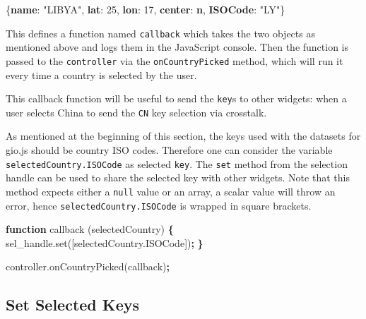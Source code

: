 \documentclass[
  10pt,
]{krantz}
\makeatletter
\newenvironment{Shaded}{\begin{snugshade}}{\end{snugshade}}
\newcommand{\AttributeTok}[1]{\textcolor[rgb]{0.61,0.61,0.61}{#1}}
\newcommand{\DecValTok}[1]{\textcolor[rgb]{0.06,0.06,0.06}{#1}}
\newcommand{\ErrorTok}[1]{\textcolor[rgb]{0.14,0.14,0.14}{\textbf{#1}}}
\newcommand{\FunctionTok}[1]{\textcolor[rgb]{0,0,0}{#1}}
\newcommand{\KeywordTok}[1]{\textcolor[rgb]{0.27,0.27,0.27}{\textbf{#1}}}
\newcommand{\NormalTok}[1]{#1}
\newcommand{\OperatorTok}[1]{\textcolor[rgb]{0.43,0.43,0.43}{\textbf{#1}}}
\newcommand{\StringTok}[1]{\textcolor[rgb]{0.5,0.5,0.5}{#1}}
\newcommand{\VariableTok}[1]{\textcolor[rgb]{0,0,0}{#1}}
\newenvironment{kframe}{%
\medskip{}
\setlength{\fboxsep}{.8em}
 \def\at@end@of@kframe{}%
 \ifinner\ifhmode%
  \def\at@end@of@kframe{\end{minipage}}%
  \begin{minipage}{\columnwidth}%
 \fi\fi%
 \def\FrameCommand##1{\hskip\@totalleftmargin \hskip-\fboxsep
 \colorbox{shadecolor}{##1}\hskip-\fboxsep
     \hskip-\linewidth \hskip-\@totalleftmargin \hskip\columnwidth}%
 \MakeFramed {\advance\hsize-\width
   \@totalleftmargin\z@ \linewidth\hsize
   \@setminipage}}%
 {\par\unskip\endMakeFramed%
 \at@end@of@kframe}
\renewenvironment{Shaded}{\begin{kframe}}{\end{kframe}}
\makeatother
\begin{document}
\begin{Shaded}
\begin{Highlighting}[]
\FunctionTok{\{}\ErrorTok{name}\FunctionTok{:} \StringTok{"LIBYA"}\FunctionTok{,} \ErrorTok{lat}\FunctionTok{:} \DecValTok{25}\FunctionTok{,} \ErrorTok{lon}\FunctionTok{:} \DecValTok{17}\FunctionTok{,} \ErrorTok{center}\FunctionTok{:} \ErrorTok{n}\FunctionTok{,} \ErrorTok{ISOCode}\FunctionTok{:} \StringTok{"LY"}\FunctionTok{\}}
\end{Highlighting}
\end{Shaded}

This defines a function named \texttt{callback} which takes the two objects as mentioned above and logs them in the JavaScript console. Then the function is passed to the \texttt{controller} via the \texttt{onCountryPicked} method, which will run it every time a country is selected by the user.

This callback function will be useful to send the \texttt{key}s to other widgets: when a user selects China to send the \texttt{CN} key selection via crosstalk.

As mentioned at the beginning of this section, the keys used with the datasets for gio.js should be country ISO codes. Therefore one can consider the variable \texttt{selectedCountry.ISOCode} as selected \texttt{key}. The \texttt{set} method from the selection handle can be used to share the selected key with other widgets. Note that this method expects either a \texttt{null} value or an array, a scalar value will throw an error, hence \texttt{selectedCountry.ISOCode} is wrapped in square brackets.

\begin{Shaded}
\begin{Highlighting}[]
\KeywordTok{function} \AttributeTok{callback}\NormalTok{ (selectedCountry) }\OperatorTok{\{}
  \VariableTok{sel\_handle}\NormalTok{.}\AttributeTok{set}\NormalTok{([}\VariableTok{selectedCountry}\NormalTok{.}\AttributeTok{ISOCode}\NormalTok{])}\OperatorTok{;}
\OperatorTok{\}}

\VariableTok{controller}\NormalTok{.}\AttributeTok{onCountryPicked}\NormalTok{(callback)}\OperatorTok{;}
\end{Highlighting}
\end{Shaded}

\hypertarget{linking-widgets-set-keys}{%
\subsection{Set Selected Keys}\label{linking-widgets-set-keys}}
\end{document}
